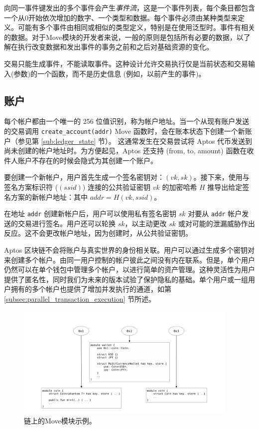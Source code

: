 \documentclass{article}
\begin{document}
向同一事件键发出的多个事件会产生\emph{事件流}，这是一个事件列表，每个条目都包含一个从0开始依次增加的数字、一个类型和数据。每个事件必须由某种类型来定义。可能有多个事件由相同或相似的类型定义，特别是在使用泛型时。事件有相关的数据。对于Move模块的开发者来说，一般的原则是包括所有必要的数据，以了解在执行改变数据和发出事件的事务之前和之后对基础资源的变化。

交易只能生成事件，不能读取事件。这种设计允许交易执行仅是当前状态和交易输入(参数)的一个函数，而不是历史信息 (例如，以前产生的事件)。

\subsection{账户}
\label{sec:accounts}

每个帐户都由一个唯一的 256 位值识别，称为帐户地址。当一个从现有账户发送的交易调用 \texttt{create_account(addr)} Move 函数时，会在账本状态下创建一个新账户（参见第 \ref{sub:ledger_state} 节）。 这通常发生在交易尝试将 Aptos 代币发送到尚未创建的帐户地址时。为方便起见，Aptos 还支持 \texttttransfer(from, to, amount) 函数在收件人账户不存在的时候会隐式为其创建一个账户。

要创建一个新帐户，用户首先生成一个签名密钥对：$(vk, sk)$。接下来，使用与签名方案标识符 ($(ssid)$) 连接的公共验证密钥 $vk$ 的加密哈希 $H$ 推导出给定签名方案的新帐户地址：其中 $addr = H(vk, ssid)$。 

在地址 \texttt{addr} 创建新帐户后，用户可以使用私有签名密钥 $sk$ 对要从 \texttt{addr} 帐户发送的交易进行签名。用户还可以轮换 $sk$，以主动更改 $sk$ 或对可能的泄漏威胁作出反应。这不会更改帐户地址，因为创建时，从公共验证密钥。 

Aptos 区块链不会将账户与真实世界的身份相关联。用户可以通过生成多个密钥对来创建多个帐户。由同一用户控制的帐户彼此之间没有内在联系。但是，单个用户仍然可以在单个钱包中管理多个帐户，以进行简单的资产管理。这种灵活性为用户提供了匿名性，同时我们为未来的版本试验了保护隐私的基础。单个用户或一组用户拥有的多个帐户也提供了增加并发执行的通道，如第 \ref{subsec:parallel_transaction_execution} 节所述。

\begin{figure}
\centering
\includegraphics[width=0.95\textwidth]{move_1.png}
\caption{\label{fig:move_modules}链上的Move模块示例。}
\end{figure}
\end{document}
